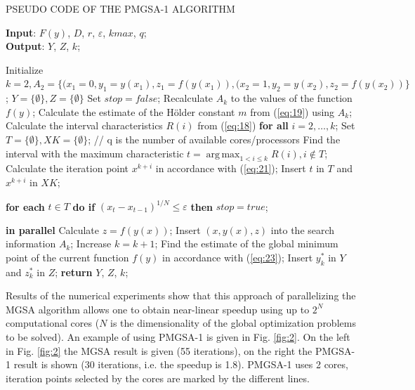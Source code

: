 \documentclass[review]{elsarticle}
\DeclareMathOperator*{\argmax}{arg\,max}
\begin{document}
\begin{algorithm}[]
\caption{PSEUDO CODE OF THE PMGSA-1 ALGORITHM} \label{alg:2}
\scriptsize
\hspace*{\algorithmicindent} \textbf{Input}: $F(y)$, $D$, $r$, $\varepsilon$, $kmax$, $q$;\\
\hspace*{\algorithmicindent} \textbf{Output}: $Y$, $Z$, $k$;
\begin{algorithmic}[1]
\State Initialize $ k=2, A_2=\{(x_1=0,y_1=y(x_1),z_1=f(y(x_1)),(x_2=1,y_2=y(x_2),z_2=f(y(x_2))\} $;
\State $Y = \{\emptyset \}, Z = \{\emptyset\}$
\State Set $stop = false$;
\State Recalculate $A_k$ to the values of the function $f(y)$;
  \State Calculate the estimate of the H\"older constant $m$ from (\ref{eq:19}) using $A_k$;
  \State Calculate the interval characteristics $R(i)$ from (\ref{eq:18}) \textbf{for all} $i = 2, \dots, k$;
	\State Set $T = \{ \emptyset \}, XK = \{ \emptyset \}$;
	// q is the number of available cores/processors
	  \State Find the interval with the maximum characteristic $t= \argmax_{1<i \leq k} R(i), i \notin T$;
		\State Calculate the iteration point $x^{k+i}$ in accordance with (\ref{eq:21});
    \State Insert $t$ in $T$ and $x^{k+i}$ in $XK$;

	\EndFor
  \State \textbf{for each} $t \in T$ \textbf{do if} $(x_t-x_{t-1} )^{1/N} \leq \varepsilon$ \textbf{then} $stop = true$;
	
	   \textbf{in parallel}
	    \State Calculate $z = f( y(x))$;
      \State Insert $(x, y(x), z)$ into the search information $A_k$;
      \State Increase $k = k + 1$;
	  \EndFor
  \EndIf
	\State Find the estimate of the global minimum point of the current function $f(y)$ in accordance with (\ref{eq:23});
	\State Insert $y_k^*$ in $Y$ and $z_k^*$ in $Z$;
  \EndWhile
\EndFor
\State \textbf{return} $Y$, $Z$, $k$;
\end{algorithmic}
\end{algorithm}

Results of the numerical experiments show that this approach of parallelizing the MGSA algorithm allows one to obtain near-linear speedup using up to $2^N$ computational cores ($N$ is the dimensionality of the global optimization problems to be solved). An example of using PMGSA-1 is given in Fig. \ref{fig:2}. On the left in Fig. \ref{fig:2} the MGSA result is given (55 iterations), on the right the PMGSA-1 result is shown (30 iterations, i.e. the speedup is 1.8). PMGSA-1 uses 2 cores, iteration points selected by the cores are marked by the different lines.
\end{document}
